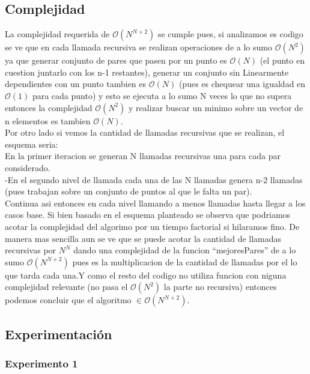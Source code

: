     \subsection{Complejidad}

    	La complejidad requerida de $\mathcal{O}(N^{N+2})$ se cumple pues, si analizamos es codigo se ve que en cada llamada recursiva se realizan operaciones de a lo sumo $\mathcal{O}(N^{2})$ ya que generar conjunto de pares que pasen por un punto es $\mathcal{O}(N)$ (el punto en cuestion juntarlo con los n-1 restantes), generar un conjunto sin Linearmente dependientes con un punto tambien es $\mathcal{O}(N)$ (pues es chequear una igualdad en  $\mathcal{O}(1)$ para cada punto) y esto se ejecuta a lo sumo N veces lo que no supera entonces la complejidad $\mathcal{O}(N^{2})$ y realizar buscar un minimo sobre un vector de n elementos es tambien $\mathcal{O}(N)$. \\
		Por otro lado si vemos la cantidad de llamadas recursivas que se realizan, el esquema seria:\\
		En la primer iteracion se generan N llamadas recursivas una para cada par considerado.\\
		-En el segundo nivel de llamada cada una de las N llamadas genera n-2 llamadas (pues trabajan sobre un conjunto de puntos al que le falta un par). \\ 
		Continua asi entonces en cada nivel llamando a menos llamadas hasta llegar a los casos base.
		Si bien basado en el esquema planteado se observa que podriamos acotar la complejidad del algorimo por un tiempo factorial si hilaramos fino. De manera mas sencilla aun se ve que se puede acotar la cantidad de llamadas recursivas por $N^{N}$ dando una complejidad de la funcion ``mejoresPares'' de a lo sumo $\mathcal{O}(N^{N+2})$ pues es la multiplicacion de la cantidad de llamadas por el lo que tarda cada una.Y como el resto del codigo no utiliza funcion con niguna complejidad relevante (no pasa el $\mathcal{O}(N^{2})$ la parte no recursiva) entonces podemos concluir que el algoritmo $ \in \mathcal{O}(N^{N+2})$.




    \subsection{Experimentación}

    	\subsubsection*{Experimento 1}\;

